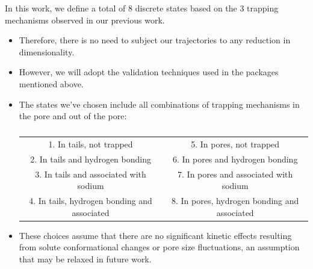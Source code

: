 \documentclass{article}
\begin{document}
  In this work, we define a total of 8 discrete states based on the 3 trapping
  mechanisms observed in our previous work. 
  \begin{itemize}
  	\item Therefore, there is no need to subject our trajectories to any reduction
  	in dimensionality. 
  	\item However, we will adopt the validation techniques used in the packages
  	mentioned above.  
  	\item The states we've chosen include all combinations of trapping mechanisms 
  	in the pore and out of the pore:
    \begin{table}[!htb]
	  \centering
	  \begin{tabular}{|c|c|}
	  \hline
	  1. In tails, not trapped                     & 5. In pores, not trapped                     \\
	  2. In tails and hydrogen bonding             & 6. In pores and hydrogen bonding             \\
	  3. In tails and associated with sodium       & 7. In pores and associated with sodium       \\
	  4. In tails, hydrogen bonding and associated & 8. In pores, hydrogen bonding and associated \\
	  \hline
	  \end{tabular}
	  \caption{}\label{table:water_content}
   \end{table}
  	\item These choices assume that there are no significant kinetic effects resulting
  	from solute conformational changes or pore size fluctuations, an assumption 
  	that may be relaxed in future work.
  \end{itemize}
  
\end{document}

